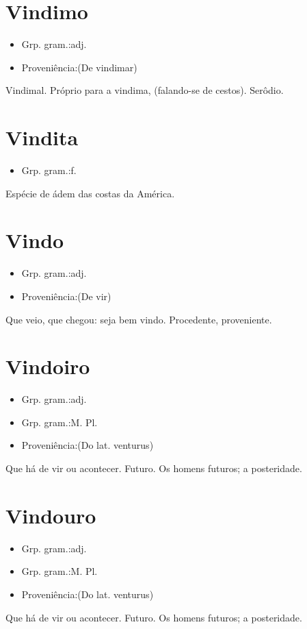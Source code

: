 \documentclass{article}
\begin{document}
\section{Vindimo}
\begin{itemize}
\item {Grp. gram.:adj.}
\end{itemize}
\begin{itemize}
\item {Proveniência:(De \textunderscore vindimar\textunderscore )}
\end{itemize}
Vindimal.
Próprio para a vindima, (falando-se de cestos).
Serôdio.
\section{Vindita}
\begin{itemize}
\item {Grp. gram.:f.}
\end{itemize}
Espécie de ádem das costas da América.
\section{Vindo}
\begin{itemize}
\item {Grp. gram.:adj.}
\end{itemize}
\begin{itemize}
\item {Proveniência:(De \textunderscore vir\textunderscore )}
\end{itemize}
Que veio, que chegou: \textunderscore seja bem vindo\textunderscore .
Procedente, proveniente.
\section{Vindoiro}
\begin{itemize}
\item {Grp. gram.:adj.}
\end{itemize}
\begin{itemize}
\item {Grp. gram.:M. Pl.}
\end{itemize}
\begin{itemize}
\item {Proveniência:(Do lat. \textunderscore venturus\textunderscore )}
\end{itemize}
Que há de vir ou acontecer.
Futuro.
Os homens futuros; a posteridade.
\section{Vindouro}
\begin{itemize}
\item {Grp. gram.:adj.}
\end{itemize}
\begin{itemize}
\item {Grp. gram.:M. Pl.}
\end{itemize}
\begin{itemize}
\item {Proveniência:(Do lat. \textunderscore venturus\textunderscore )}
\end{itemize}
Que há de vir ou acontecer.
Futuro.
Os homens futuros; a posteridade.
\end{document}
